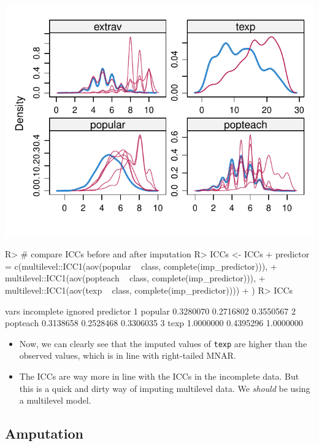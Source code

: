 \documentclass[
]{jss}
\begin{document}
\begin{CodeChunk}
\begin{center}\includegraphics{Manuscript_files/figure-latex/pop-predictor-3} \end{center}

\begin{CodeInput}
R> # compare ICCs before and after imputation
R> ICCs <- ICCs %
+            predictor = c(multilevel::ICC1(aov(popular ~ class, complete(imp_predictor))), 
+                         multilevel::ICC1(aov(popteach ~ class, complete(imp_predictor))), 
+                         multilevel::ICC1(aov(texp ~ class, complete(imp_predictor))))
+            )
R> ICCs
\end{CodeInput}
\begin{CodeOutput}
      vars incomplete   ignored predictor
1  popular  0.3280070 0.2716802 0.3550567
2 popteach  0.3138658 0.2528468 0.3306035
3     texp  1.0000000 0.4395296 1.0000000
\end{CodeOutput}
\end{CodeChunk}

\begin{itemize}
\item
  Now, we can clearly see that the imputed values of \texttt{texp} are
  higher than the observed values, which is in line with right-tailed
  MNAR.
\item
  The ICCs are way more in line with the ICCs in the incomplete data.
  But this is a quick and dirty way of imputing multilevel data. We
  \emph{should} be using a multilevel model.
\end{itemize}

\hypertarget{amputation}{%
\subsection{Amputation}\label{amputation}}
\end{document}
